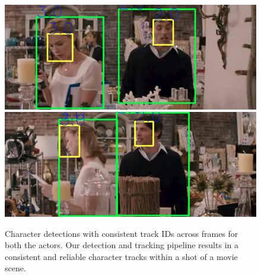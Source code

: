 \begin{figure}[t]
\centering
\includegraphics[width=0.49\linewidth]{Figures/sort_tracked_detections_2.png}
\includegraphics[width=0.49\linewidth]{Figures/sort_tracked_detections_1.png}
\vspace{-2mm}
\caption{Character detections with consistent track IDs across frames for both the actors. Our detection and tracking pipeline results in a consistent and reliable character tracks within a shot of a movie scene.}
\vspace{-4mm}
\label{fig:sortTrackedDetections}
\end{figure}
